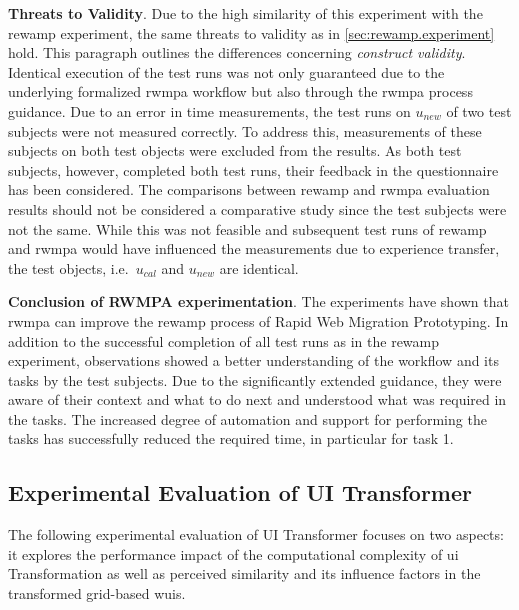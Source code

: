 \textbf{Threats to Validity}.
Due to the high similarity of this experiment with the \gls{rewamp} experiment, the same threats to validity as in \cref{sec:rewamp.experiment} hold.
This paragraph outlines the differences concerning \emph{construct validity}.
Identical execution of the test runs was not only guaranteed due to the underlying formalized \gls{rwmpa} workflow but also through the \gls{rwmpa} process guidance.
Due to an error in time measurements, the test runs on \(u_{new}\) of two test subjects were not measured correctly.
To address this, measurements of these subjects on both test objects were excluded from the results.
As both test subjects, however, completed both test runs, their feedback in the questionnaire has been considered.
The comparisons between \gls{rewamp} and \gls{rwmpa} evaluation results should not be considered a comparative study since the test subjects were not the same.
While this was not feasible and subsequent test runs of \gls{rewamp} and \gls{rwmpa} would have influenced the measurements due to experience transfer, the test objects, i.e.~\(u_{cal}\) and \(u_{new}\) are identical.
\vspace{-8pt}

\textbf{Conclusion of RWMPA experimentation}.
The experiments have shown that \gls{rwmpa} can improve the \gls{rewamp} process of \gls{Rapid Web Migration Prototyping}.
In addition to the successful completion of all test runs as in the \gls{rewamp} experiment, observations showed a better understanding of the workflow and its tasks by the test subjects.
Due to the significantly extended guidance, they were aware of their context and what to do next and understood what was required in the tasks.
The increased degree of automation and support for performing the tasks has successfully reduced the required time, in particular for task 1.

\vspace{-10pt}
\hypertarget{sec:uitransformer.experiment}{%
\subsection{Experimental Evaluation of UI Transformer}\label{sec:uitransformer.experiment}}
\vspace{10pt}

The following experimental evaluation of UI Transformer focuses on two aspects: it explores the performance impact of the computational complexity of \gls{ui} \gls{Transformation} as well as perceived similarity and its influence factors in the transformed grid-based \glspl{wui}.

